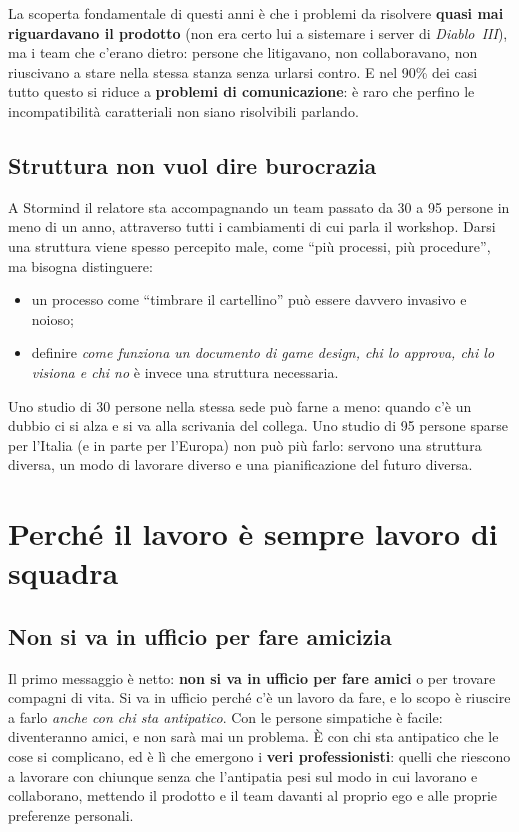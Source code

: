 La scoperta fondamentale di questi anni è che i problemi da risolvere
\textbf{quasi mai riguardavano il prodotto} (non era certo lui a sistemare i
server di \emph{Diablo~III}), ma i team che c'erano dietro: persone che
litigavano, non collaboravano, non riuscivano a stare nella stessa stanza
senza urlarsi contro. E nel 90\% dei casi tutto questo si riduce a
\textbf{problemi di comunicazione}: è raro che perfino le incompatibilità
caratteriali non siano risolvibili parlando.

\subsection{Struttura non vuol dire burocrazia}

A Stormind il relatore sta accompagnando un team passato da 30 a 95 persone
in meno di un anno, attraverso tutti i cambiamenti di cui parla il workshop.
Darsi una struttura viene spesso percepito male, come ``più processi, più
procedure'', ma bisogna distinguere:
\begin{itemize}
  \item un processo come ``timbrare il cartellino'' può essere davvero
        invasivo e noioso;
  \item definire \emph{come funziona un documento di game design, chi lo
        approva, chi lo visiona e chi no} è invece una struttura necessaria.
\end{itemize}
Uno studio di 30 persone nella stessa sede può farne a meno: quando c'è un
dubbio ci si alza e si va alla scrivania del collega. Uno studio di 95
persone sparse per l'Italia (e in parte per l'Europa) non può più farlo:
servono una struttura diversa, un modo di lavorare diverso e una
pianificazione del futuro diversa.

\section{Perché il lavoro è sempre lavoro di squadra}
\label{sec:z1-squadra}

\subsection{Non si va in ufficio per fare amicizia}

Il primo messaggio è netto: \textbf{non si va in ufficio per fare amici} o
per trovare compagni di vita. Si va in ufficio perché c'è un lavoro da fare, e
lo scopo è riuscire a farlo \emph{anche con chi sta antipatico}. Con le
persone simpatiche è facile: diventeranno amici, e non sarà mai un problema.
È con chi sta antipatico che le cose si complicano, ed è lì che emergono i
\textbf{veri professionisti}: quelli che riescono a lavorare con chiunque
senza che l'antipatia pesi sul modo in cui lavorano e collaborano, mettendo il
prodotto e il team davanti al proprio ego e alle proprie preferenze personali.

